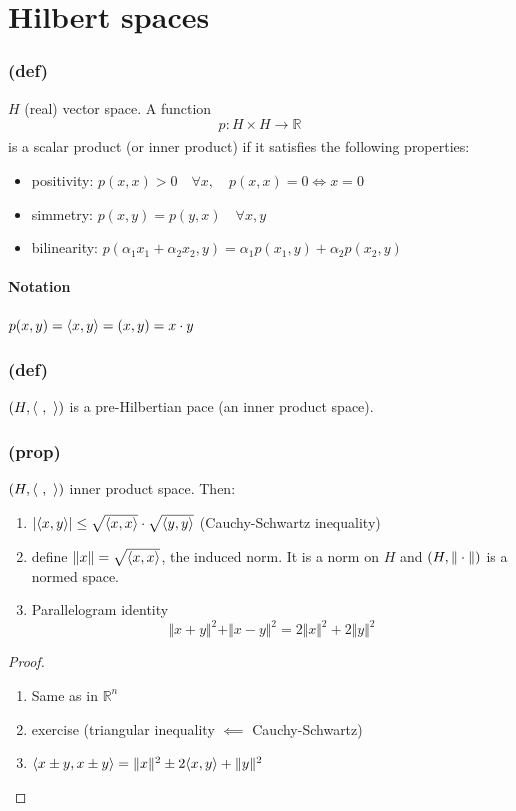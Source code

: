 \section{Hilbert spaces}
\subsubsection{(def) }
$H$ (real) vector space. A function
$$p:H\times H\xrightarrow[\quad]{} \mathbb R$$
is a scalar product (or inner product) if it satisfies the following properties:
\begin{itemize}
    \item positivity: $p(x,x)>0\quad \forall x, \quad p(x,x)=0\iff x=0$
    \item simmetry: $p(x,y)=p(y,x)\quad \forall x,y$
    \item bilinearity: $p(\alpha_1x_1+\alpha_2x_2,y)=\alpha_1 p(x_1,y)+\alpha_2p(x_2,y)$
\end{itemize}
\paragraph{Notation} $p(x,y)=\langle {x} , {y} \rangle=(x,y)=x\cdot y$
\subsubsection{(def)}
$(H,\langle {\ } , {\ } \rangle)$ is a pre-Hilbertian pace (an inner product space).
\subsubsection{(prop)}
$(H,\langle {\ } , {\ } \rangle)$ inner product space. Then:
\begin{enumerate}
    \item $|\langle {x} , {y} \rangle|\leq \sqrt{\langle {x} , {x} \rangle}\cdot \sqrt{ \langle {y} , {y} \rangle}$ (Cauchy-Schwartz inequality)
    \item define $\Vert x\Vert =\sqrt{\langle {x} , {x} \rangle}$, the induced norm.
    It is a norm on $H$ and $(H,\Vert \cdot \Vert)$ is a normed space.
    \item Parallelogram identity
    $$\Vert x+y\Vert ^2 +\Vert x-y\Vert ^2=2\Vert x\Vert ^2 +2 \Vert y\Vert ^2$$
\end{enumerate}
\begin{proof}\ 
    \begin{enumerate}
        \item Same as in $\mathbb R^n$
        \item exercise (triangular inequality $\impliedby$ Cauchy-Schwartz)
        \item $\langle {x\pm y} , {x \pm y} \rangle=\Vert x\Vert ^2\pm 2\langle {x} , {y} \rangle +\Vert y\Vert ^2$
    \end{enumerate}
\end{proof}
